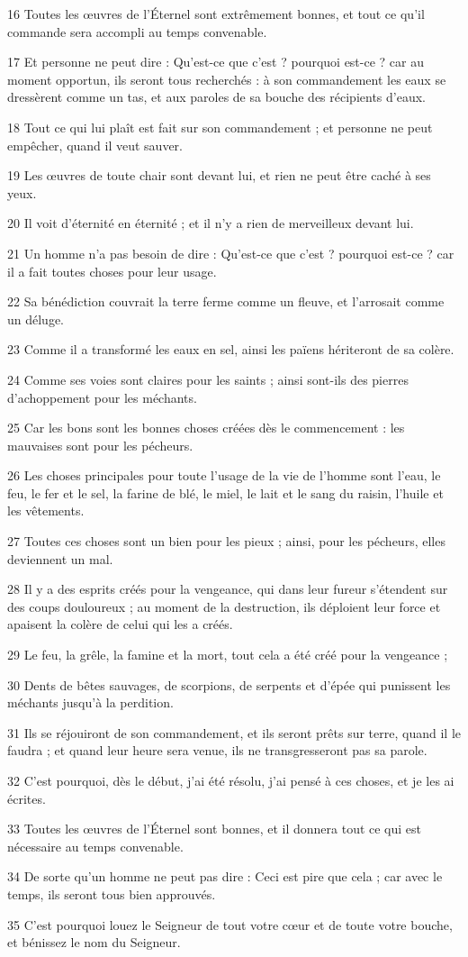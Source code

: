\par 16 Toutes les œuvres de l'Éternel sont extrêmement bonnes, et tout ce qu'il commande sera accompli au temps convenable.
\par 17 Et personne ne peut dire : Qu'est-ce que c'est ? pourquoi est-ce ? car au moment opportun, ils seront tous recherchés : à son commandement les eaux se dressèrent comme un tas, et aux paroles de sa bouche des récipients d'eaux.
\par 18 Tout ce qui lui plaît est fait sur son commandement ; et personne ne peut empêcher, quand il veut sauver.
\par 19 Les œuvres de toute chair sont devant lui, et rien ne peut être caché à ses yeux.
\par 20 Il voit d'éternité en éternité ; et il n'y a rien de merveilleux devant lui.
\par 21 Un homme n'a pas besoin de dire : Qu'est-ce que c'est ? pourquoi est-ce ? car il a fait toutes choses pour leur usage.
\par 22 Sa bénédiction couvrait la terre ferme comme un fleuve, et l'arrosait comme un déluge.
\par 23 Comme il a transformé les eaux en sel, ainsi les païens hériteront de sa colère.
\par 24 Comme ses voies sont claires pour les saints ; ainsi sont-ils des pierres d'achoppement pour les méchants.
\par 25 Car les bons sont les bonnes choses créées dès le commencement : les mauvaises sont pour les pécheurs.
\par 26 Les choses principales pour toute l'usage de la vie de l'homme sont l'eau, le feu, le fer et le sel, la farine de blé, le miel, le lait et le sang du raisin, l'huile et les vêtements.
\par 27 Toutes ces choses sont un bien pour les pieux ; ainsi, pour les pécheurs, elles deviennent un mal.
\par 28 Il y a des esprits créés pour la vengeance, qui dans leur fureur s'étendent sur des coups douloureux ; au moment de la destruction, ils déploient leur force et apaisent la colère de celui qui les a créés.
\par 29 Le feu, la grêle, la famine et la mort, tout cela a été créé pour la vengeance ;
\par 30 Dents de bêtes sauvages, de scorpions, de serpents et d'épée qui punissent les méchants jusqu'à la perdition.
\par 31 Ils se réjouiront de son commandement, et ils seront prêts sur terre, quand il le faudra ; et quand leur heure sera venue, ils ne transgresseront pas sa parole.
\par 32 C'est pourquoi, dès le début, j'ai été résolu, j'ai pensé à ces choses, et je les ai écrites.
\par 33 Toutes les œuvres de l'Éternel sont bonnes, et il donnera tout ce qui est nécessaire au temps convenable.
\par 34 De sorte qu'un homme ne peut pas dire : Ceci est pire que cela ; car avec le temps, ils seront tous bien approuvés.
\par 35 C'est pourquoi louez le Seigneur de tout votre cœur et de toute votre bouche, et bénissez le nom du Seigneur.

